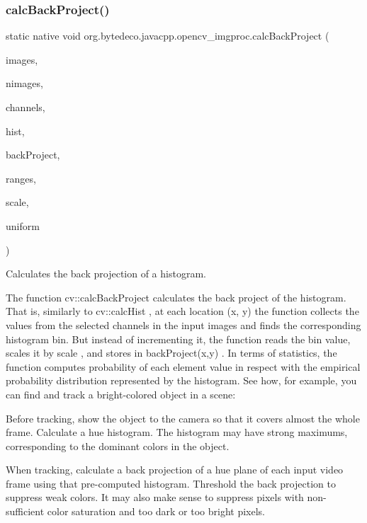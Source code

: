 \subsubsection{\texorpdfstring{calc\+Back\+Project()}{calcBackProject()}\hspace{0.1cm}{\footnotesize\ttfamily [1/3]}}
{\footnotesize\ttfamily static native void org.\+bytedeco.\+javacpp.\+opencv\+\_\+imgproc.\+calc\+Back\+Project (\begin{DoxyParamCaption}\item[{@Const Mat}]{images,  }\item[{int}]{nimages,  }\item[{@Const Int\+Pointer}]{channels,  }\item[{@By\+Val Mat}]{hist,  }\item[{@By\+Val Mat}]{back\+Project,  }\item[{@Cast(\char`\"{}const float$\ast$$\ast$\char`\"{}) Pointer\+Pointer}]{ranges,  }\item[{double}]{scale,  }\item[{@Cast(\char`\"{}bool\char`\"{}) boolean}]{uniform }\end{DoxyParamCaption})\hspace{0.3cm}{\ttfamily [static]}}



Calculates the back projection of a histogram. 

The function cv\+::calc\+Back\+Project calculates the back project of the histogram. That is, similarly to cv\+::calc\+Hist , at each location (x, y) the function collects the values from the selected channels in the input images and finds the corresponding histogram bin. But instead of incrementing it, the function reads the bin value, scales it by scale , and stores in back\+Project(x,y) . In terms of statistics, the function computes probability of each element value in respect with the empirical probability distribution represented by the histogram. See how, for example, you can find and track a bright-\/colored object in a scene\+: 


\begin{DoxyItemize}
\item Before tracking, show the object to the camera so that it covers almost the whole frame. Calculate a hue histogram. The histogram may have strong maximums, corresponding to the dominant colors in the object. 
\end{DoxyItemize}


\begin{DoxyItemize}
\item When tracking, calculate a back projection of a hue plane of each input video frame using that pre-\/computed histogram. Threshold the back projection to suppress weak colors. It may also make sense to suppress pixels with non-\/sufficient color saturation and too dark or too bright pixels. 
\end{DoxyItemize}


